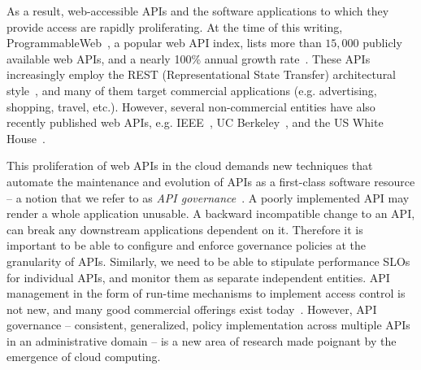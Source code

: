 As a result, web-accessible APIs and the software applications to which
they provide access are rapidly proliferating. At the time of this writing, 
ProgrammableWeb~\cite{pweb}, a popular web API index, lists more than $15,000$
publicly available web APIs, and a nearly 100\% annual growth rate~\cite{pweb_growth}.
These APIs increasingly employ the REST (Representational State Transfer) architectural style~\cite{Fielding:2000:ASD:932295}, and 
many of them target commercial applications (e.g. advertising, shopping, travel, etc.).
However, several non-commercial entities have also recently published web 
APIs, e.g. IEEE~\cite{ieeeapis}, UC Berkeley~\cite{ucbapis}, and the US White
House~\cite{whitehouseapis}. 

This proliferation of web APIs in the cloud demands new techniques that
automate the maintenance and evolution of APIs as a first-class software
resource -- a notion that we refer
to as \textit{API governance}~\cite{6903538}. A poorly implemented API may render a whole application unusable.
A backward incompatible change to an API, can break any downstream applications dependent on it. 
Therefore it is important to be able to configure and enforce governance policies at the granularity of
APIs. Similarly, we need to be able to stipulate performance SLOs for individual APIs, and monitor
them as separate independent entities.
API management in the form of run-time mechanisms to implement
access control is not new, and many good commercial offerings exist today~\cite{3scale,apigee,layer7}.   
However, API governance -- consistent, generalized, policy
implementation across multiple APIs in an administrative domain --
is a new area of research made poignant by the emergence of cloud computing.